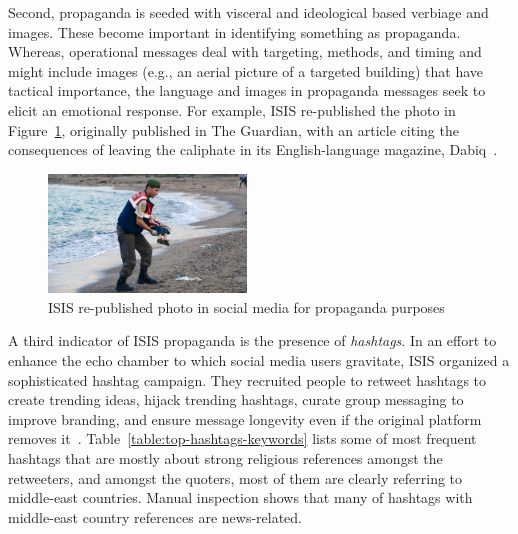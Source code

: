 \documentclass[letterpaper]{article} %
\begin{document}
Second, propaganda is seeded with visceral and ideological based verbiage and images. These become important in identifying something as propaganda. Whereas, operational messages deal with targeting, methods, and timing and might include images (e.g., an aerial picture of a targeted building) that have tactical importance, the language and images in propaganda messages seek to elicit an emotional response. For example, ISIS re-published the photo in Figure~\ref{fig:drowned-syrian-boy}, originally published in The Guardian, with an article citing the consequences of leaving the caliphate in its English-language magazine, Dabiq~\cite{theguardian}.

\begin{figure}[ht]
\includegraphics[width=0.47\textwidth]{img/drowned-syrian-boy.jpeg}
\caption{ISIS re-published photo in social media for propaganda purposes}
\label{fig:drowned-syrian-boy}
\end{figure}

A third indicator of ISIS propaganda is the presence of \textit{hashtags}. In an effort to enhance the echo chamber to which social media users gravitate, ISIS organized a sophisticated hashtag campaign. They recruited people to retweet hashtags to create trending ideas, hijack trending hashtags, curate group messaging to improve branding, and ensure message longevity even if the original platform removes it~\cite{telegram-to-twitter}. Table~\ref{table:top-hashtags-keywords} lists some of most frequent hashtags that are mostly about strong religious references amongst the retweeters, and amongst the quoters, most of them are clearly referring to middle-east countries. Manual inspection shows that many of hashtags with middle-east country references are news-related.
\end{document}

